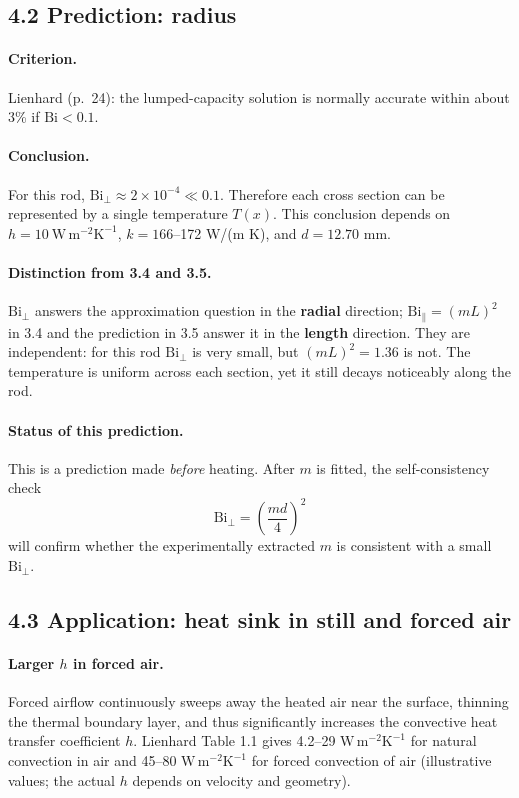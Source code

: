 \documentclass[reprint, amsmath, amssymb, aps, prl]{revtex4-2}
\newcommand{\Biperp}{\mathrm{Bi}_\perp}
\newcommand{\WmmK}{\mathrm{W\,m^{-2}K^{-1}}}
\begin{document}
\subsection*{4.2 Prediction: radius}

\paragraph*{Criterion.}
Lienhard (p.~24): the lumped-capacity solution is normally accurate within about 3\% if
$\mathrm{Bi}<0.1$.

\paragraph*{Conclusion.}
For this rod, $\Biperp\approx2\times10^{-4}\ll0.1$. Therefore each cross section can be
represented by a single temperature $T(x)$. This conclusion depends on $h=10~\WmmK$,
$k=166$--172 W/(m K), and $d=12.70$ mm.

\paragraph*{Distinction from 3.4 and 3.5.}
$\Biperp$ answers the approximation question in the \textbf{radial} direction;
$\mathrm{Bi}_\parallel=(mL)^2$ in 3.4 and the prediction in 3.5 answer it in the
\textbf{length} direction. They are independent: for this rod $\Biperp$ is very small,
but $(mL)^2=1.36$ is not. The temperature is uniform across each section, yet it still
decays noticeably along the rod.

\paragraph*{Status of this prediction.}
This is a prediction made \emph{before} heating. After $m$ is fitted, the
self-consistency check
\begin{equation*}
\Biperp=\left(\frac{md}{4}\right)^2
\end{equation*}
will confirm whether the experimentally extracted $m$ is consistent with a small
$\Biperp$.

\subsection*{4.3 Application: heat sink in still and forced air}

\paragraph*{Larger $h$ in forced air.}
Forced airflow continuously sweeps away the heated air near the surface, thinning the
thermal boundary layer, and thus significantly increases the convective heat transfer
coefficient $h$. Lienhard Table 1.1 gives 4.2--29 $\WmmK$ for natural convection in air
and 45--80 $\WmmK$ for forced convection of air (illustrative values; the actual $h$
depends on velocity and geometry).
\end{document}
